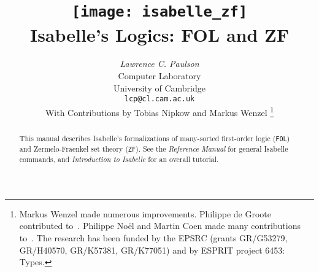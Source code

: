 \documentclass[12pt]{report}
\title{\texttt{[image: isabelle\_zf]} \\[4ex] 
       Isabelle's Logics: FOL and ZF}
\author{{\em Lawrence C. Paulson}\\
        Computer Laboratory \\ University of Cambridge \\
        \texttt{lcp@cl.cam.ac.uk}\\[3ex] 
        With Contributions by Tobias Nipkow and Markus Wenzel%
\thanks{Markus Wenzel made numerous improvements.
    Philippe de Groote contributed to~\ZF{}.  Philippe No\"el and
    Martin Coen made many contributions to~\ZF{}.  The research has 
    been funded by the EPSRC (grants GR/G53279, GR/H40570, GR/K57381,
    GR/K77051) and by ESPRIT project 6453: Types.}
}
\begin{document}
\maketitle 

\begin{abstract}
This manual describes Isabelle's formalizations of many-sorted first-order
logic (\texttt{FOL}) and Zermelo-Fraenkel set theory (\texttt{ZF}).  See the
\emph{Reference Manual} for general Isabelle commands, and \emph{Introduction
  to Isabelle} for an overall tutorial.
\end{abstract}

 \tableofcontents \clearfirst






\end{document}
